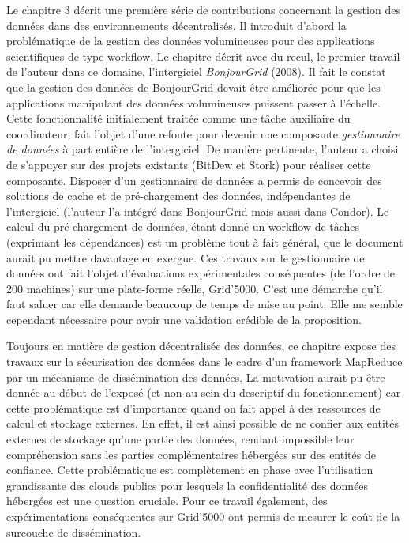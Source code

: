 \documentclass[a4paper,12pt]{article}
\begin{document}
Le chapitre 3  décrit une première série de contributions  concernant la gestion
des  données dans  des environnements  décentralisés.  Il  introduit d'abord  la
problématique  de la  gestion  des données  volumineuses  pour des  applications
scientifiques de  type workflow.  Le chapitre  décrit avec du recul,  le premier
travail de l'auteur dans ce domaine, l'intergiciel \emph{BonjourGrid} (2008). Il
fait le constat que la gestion  des données de BonjourGrid devait être améliorée
pour que les applications manipulant  des données volumineuses puissent passer à
l'échelle.  Cette fonctionnalité initialement traitée comme une tâche auxiliaire
du  coordinateur,  fait  l'objet  d'une  refonte  pour  devenir  une  composante
\emph{gestionnaire  de données}  à part  entière de  l'intergiciel.  De  manière
pertinente, l'auteur a choisi de s'appuyer  sur des projets existants (BitDew et
Stork) pour réaliser  cette composante. Disposer d'un gestionnaire  de données a
permis de  concevoir des solutions  de cache  et de pré-chargement  des données,
indépendantes de l'intergiciel (l'auteur l'a intégré dans BonjourGrid mais aussi
dans Condor). Le calcul du pré-chargement de données, étant donné un workflow de
tâches (exprimant les  dépendances) est un problème tout à  fait général, que le
document aurait pu mettre davantage en  exergue. Ces travaux sur le gestionnaire
de  données  ont  fait  l'objet d'évaluations  expérimentales  conséquentes  (de
l'ordre  de 200  machines) sur  une  plate-forme réelle,  Grid'5000.  C'est  une
démarche  qu'il faut  saluer  car elle  demande  beaucoup de  temps  de mise  au
point. Elle me semble cependant nécessaire pour avoir une validation crédible de
la proposition.

Toujours en matière de gestion décentralisée des données, ce chapitre expose des
travaux sur la  sécurisation des données dans le cadre  d'un framework MapReduce
par un  mécanisme de  dissémination des  données. La  motivation aurait  pu être
donnée au début de l'exposé (et non au sein du descriptif du fonctionnement) car
cette problématique  est d'importance quand  on fait  appel à des  ressources de
calcul et stockage externes.  En effet, il est ainsi possible  de ne confier aux
entités externes de stockage qu'une  partie des données, rendant impossible leur
compréhension  sans les  parties complémentaires  hébergées sur  des entités  de
confiance.  Cette problématique  est  complètement en  phase avec  l'utilisation
grandissante des  clouds publics  pour lesquels  la confidentialité  des données
hébergées  est   une  question  cruciale.    Pour  ce  travail   également,  des
expérimentations conséquentes sur Grid'5000 ont permis  de mesurer le coût de la
surcouche de dissémination.
\end{document}
